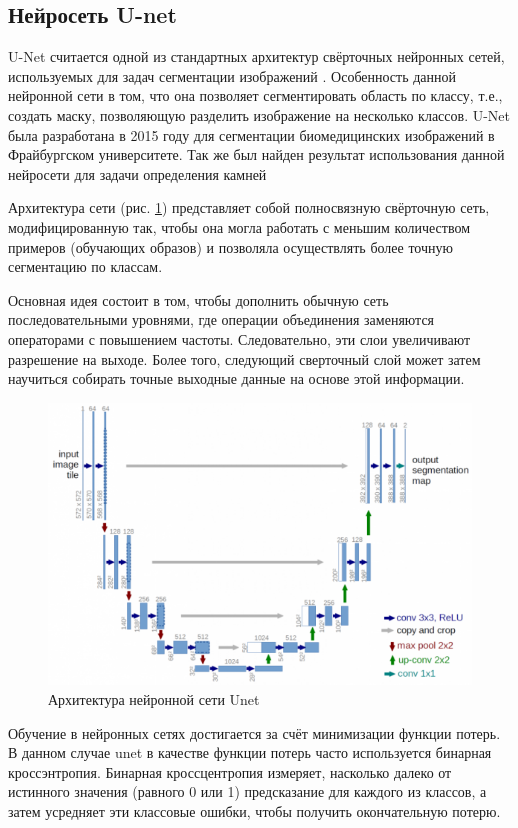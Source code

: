 \documentclass[times]{itmo-student-thesis}
\begin{document}
\subsection{Нейросеть U-net}
U-Net считается одной из стандартных архитектур свёрточных нейронных сетей, используемых для задач сегментации изображений \cite{unet}. Особенность данной нейронной сети в том, что она позволяет сегментировать область по классу, т.е., создать маску, позволяющую разделить изображение на несколько классов. U-Net  была разработана в 2015 году для сегментации биомедицинских изображений в Фрайбургском университете. Так же был найден результат использования данной нейросети для задачи определения камней \cite{unerrock}

Архитектура сети (рис. \ref{fig:unet}) представляет собой полносвязную свёрточную сеть, модифицированную так, чтобы она могла работать с меньшим количеством примеров (обучающих образов) и позволяла осуществлять более точную сегментацию по классам. 

Основная идея состоит в том, чтобы дополнить обычную сеть последовательными уровнями, где операции объединения заменяются операторами с повышением частоты. Следовательно, эти слои увеличивают разрешение на выходе. Более того, следующий сверточный слой может затем научиться собирать точные выходные данные на основе этой информации.


\begin{figure}
	\centering
	\includegraphics[width=\linewidth]{images/unet}
	\caption{Архитектура нейронной сети Unet}
	\label{fig:unet}
\end{figure}


Обучение в нейронных сетях достигается за счёт минимизации функции потерь. В данном случае unet в качестве функции потерь часто используется бинарная кроссэнтропия. Бинарная кроссцентропия измеряет, насколько далеко от истинного значения (равного 0 или 1) предсказание для каждого из классов, а затем усредняет эти классовые ошибки, чтобы получить окончательную потерю.
\end{document}
